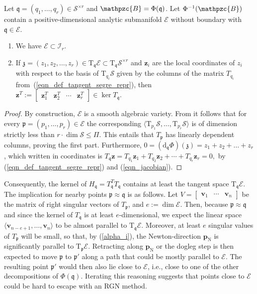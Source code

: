 \documentclass[a4paper,10pt,final]{siamart1116}
\newcommand{\tuple}[1]{\mathfrak{#1}}
\newcommand{\Var}[1]{\mathcal{#1}}
\newcommand{\tensor}[1]{\mathpzc{#1}}
\newcommand{\vect}[1]{\mathbf{#1}}
\newcommand{\Tang}[2]{\mathrm{T}_{#1} {#2}}
\newcommand{\deriv}[2]{\mathrm{d}_{#1}#2}
\newcommand{\refeqn}[1]{{(\ref{#1})}}
\numberwithin{equation}{section}
\numberwithin{figure}{section}
\numberwithin{table}{section}
\numberwithin{theorem}{section}
\begin{document}
\begin{proposition}\label{prop_curve_is_illcond}
Let $\tuple{q}=(q_1,\ldots,q_r) \in \Var{S}^{\times r}$ and $\tensor{B} = \Phi(\tuple{q})$. Let $\Phi^{-1}(\tensor{B})$ contain a positive-dimensional analytic submanifold $\Var{E}$ without boundary with $\tuple{q}\in \Var{E}$.
\begin{enumerate}
\item We have $\Var{E} \subset \Var{I}_r$.
\item If
$\tuple{z} = (z_1, z_2, \ldots, z_r) \in \Tang{\tuple{q}}{\Var{E}} \subset \Tang{\tuple{q}}{\Var{S}^{\times r}}$
and $\vect{z}_i$ are the local coordinates of $z_i$ with respect to the basis of $\Tang{q_i}{\Var{S}}$ given by the columns of the matrix $T_{q_i}$ from~\refeqn{eqn_def_tangent_segre_repr}, then
\(
\vect{z}^T := \begin{bmatrix}
\vect{z}_1^T & \vect{z}_2^T & \cdots & \vect{z}_r^T
\end{bmatrix} \in \ker T_{\tuple{q}}.
\)
\end{enumerate}
\end{proposition}
\begin{proof}
By construction, $\Var{E}$ is a smooth algebraic variety. From \cite[Lemma 6.5]{COV2017} it follows that for every $\tuple{p}=(p_1,\ldots,p_r) \in \Var{E}$ the corresponding $\langle \Tang{p_1}{\Var{S}}, \ldots, \Tang{p_r}{\Var{S}} \rangle$ is of dimension strictly less than $r \cdot \dim \Var{S} \le \Pi$. This entails that $T_{\tuple{p}}$ has linearly dependent columns, proving the first part. Furthermore, $0=(\deriv{\tuple{q}}{\Phi})( \tuple{z} )=z_1 + z_2 + \dots + z_r$, which written in coordinates is
$
 T_{\tuple{q}} \vect{z} = T_{q_1} \vect{z}_1 + T_{q_2} \vect{z}_2 + \cdots + T_{q_r} \vect{z}_r = 0,
$
by \refeqn{eqn_def_tangent_segre_repr} and \refeqn{eqn_jacobian}.
\end{proof}

Consequently, the kernel of $H_{\tuple{q}}=T_{\tuple{q}}^TT_{\tuple{q}}$ contains at least the tangent space $\Tang{\tuple{q}}{\Var E}$. The implication for nearby points $\tuple{p} \approx \tuple{q}$ is as follows. Let $V=[\begin{smallmatrix} \vect{v}_1 & \cdots & \vect{v}_n\end{smallmatrix}]$ be the matrix of right singular vectors of $T_{\tuple p}$, and $e := \dim \Var{E}$. Then, because $\tuple{p}\approx \tuple{q}$ and since the kernel of $T_{\tuple q}$ is at least $e$-dimensional, we expect the linear space $\langle \vect{v}_{n-e+1},\ldots, \vect{v}_n \rangle$ to be almost parallel to $\Tang{\tuple{q}}{\Var E}$. Moreover, at least $e$ singular values of $T_{\tuple p}$ will be small, so that, by \refeqn{alpha_i}, the Newton-direction $\vect{p}_\mathrm{N}$ is significantly parallel to $\Tang{\tuple p}{\Var E}.$
Retracting along $\vect{p}_{\text{N}}$ or the dogleg step is then expected to move $\tuple{p}$ to $\tuple{p}'$ along a path that could be mostly parallel to $\Var{E}$. The resulting point $\tuple{p}'$ would then also lie close to $\Var{E}$, i.e., close to one of the other decompositions of $\Phi(\tuple{q})$. Iterating this reasoning suggests that points close to $\Var{E}$ could be hard to escape with an RGN method.
\end{document}
